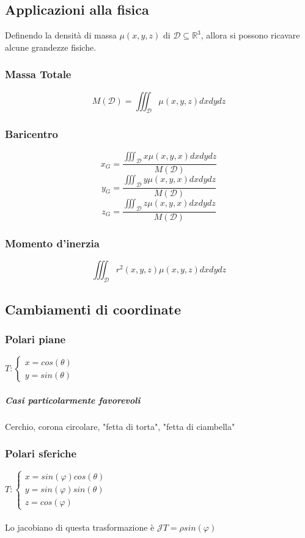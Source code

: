 \documentclass[10pt,a4paper]{report}
\begin{document}
		\subsection*{Applicazioni alla fisica}
		Definendo la densità  di massa $ \mu (x,y,z) $ di $\mathcal{D}\subseteq \mathbb{R}^{3}$, allora si possono ricavare alcune grandezze fisiche.
			\subsubsection{Massa Totale}
			\[ M(\mathcal{D})= \iiint_{\mathcal{D}} \mu(x,y,z) dx dy dz \]
			
			\subsubsection{Baricentro}
			\[ x_{G}=\frac{\iiint_{\mathcal{D}} x \mu (x,y,x) dx dy dz}{ M(\mathcal{D})} \]
			\[ y_{G}=\frac{\iiint_{\mathcal{D}} y \mu (x,y,x) dx dy dz}{ M(\mathcal{D})} \]
			\[ z_{G}=\frac{\iiint_{\mathcal{D}} z \mu (x,y,x) dx dy dz}{ M(\mathcal{D})} \]
			
			\subsubsection{Momento d'inerzia}
			\[ \iiint_{\mathcal{D}} r^{2}(x,y,z) \mu(x,y,z) dx dy dz \]

		\subsection*{Cambiamenti di coordinate}
			\subsubsection{Polari piane}
			$ T: \begin{cases} 
				x=cos(\theta) \\ 
				y=sin(\theta)
			\end{cases} $
				\subparagraph{Casi particolarmente favorevoli}
				Cerchio, corona circolare, "fetta di torta", "fetta di ciambella"
			\subsubsection{Polari sferiche}
			$ T: \begin{cases} 
				x=sin(\varphi)cos(\theta) \\ 
				y=sin(\varphi)sin(\theta) \\
				z=cos(\varphi)
			\end{cases} $
			\\ \\
			Lo jacobiano di questa trasformazione è $\mathcal{J}T=\rho sin(\varphi) $
			
\end{document}
